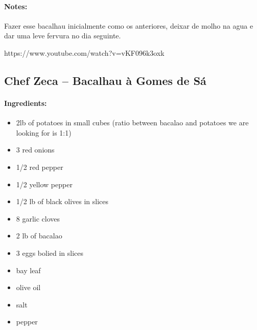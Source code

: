 \documentclass{article}
\begin{document}
\paragraph{Notes:}

Fazer esse bacalhau inicialmente como os anteriores, deixar de molho na agua e dar uma leve fervura no dia seguinte.

https://www.youtube.com/watch?v=vKF096k3oxk

\subsection{Chef Zeca – Bacalhau à Gomes de Sá}

\paragraph{Ingredients:}

\begin{itemize}
	\item 2lb of potatoes in small cubes (ratio between bacalao and potatoes we are looking for is 1:1)
	\item 3 red onions
	\item 1/2 red pepper
	\item 1/2 yellow pepper
	\item 1/2 lb of black olives in slices
	\item 8 garlic cloves
	\item 2 lb of bacalao
	\item 3 eggs bolied in slices
	\item bay leaf
	\item olive oil
	\item salt
	\item pepper
\end{itemize}
\end{document}
